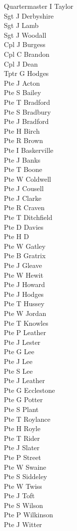 \begin{multicols}{3}
  \small
  \noindent
  Quartermaster I Taylor \\
  Sgt J Derbyshire \\
  Sgt J Lamb \\
  Sgt J Woodall \\
  Cpl J Burgess \\
  Cpl C Brandon \\
  Cpl J Dean \\
  Tptr G Hodges \\
  Pte J Acton \\
  Pte S Bailey \\
  Pte T Bradford \\
  Pte S Bradbury \\
  Pte J Bradford \\
  Pte H Birch \\
  Pte R Brown \\
  Pte I Baskerville \\
  Pte J Banks \\
  Pte T Boone \\
  Pte W Coldwell \\
  Pte J Cousell \\
  Pte J Clarke \\
  Pte R Craven \\
  Pte T Ditchfield \\
  Pte D Davies \\
  Pte H D \\
  Pte W Gatley \\
  Pte B Gratrix \\
  Pte J Gleave \\
  Pte W Hewit \\
  Pte J Howard \\
  Pte J Hodges \\
  Pte T Hussey \\
  Pte W Jordan \\
  Pte T Knowles \\
  Pte P Leather \\
  Pte J Lester \\
  Pte G Lee \\
  Pte J Lee \\
  Pte S Lee \\
  Pte J Leather \\
  Pte G Ecclestone \\
  Pte G Potter \\
  Pte S Plant \\
  Pte T Roylance \\
  Pte H Royle \\
  Pte T Rider \\
  Pte J Slater \\
  Pte P Street \\
  Pte W Swaine \\
  Pte S Siddeley \\
  Pte W Twiss \\
  Pte J Toft \\
  Pte S Wilson \\
  Pte P Wilkinson \\
  Pte J Witter \\
\end{multicols}

